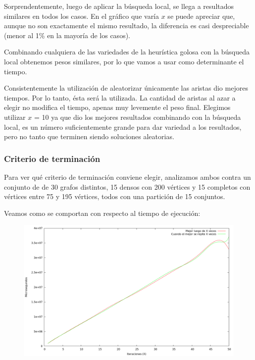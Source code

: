 \vspace*{0.5cm}

Sorprendentemente, luego de aplicar la búsqueda local, se llega a resultados
similares en todos los casos. En el gráfico que varía $x$ se puede apreciar
que, aunque no son exactamente el mismo resultado, la diferencia es casi
despreciable (menor al 1\% en la mayoría de los casos).


Combinando cualquiera de las variedades de la heurística golosa con la
búsqueda local obtenemos pesos similares, por lo que vamos a usar como
determinante el tiempo.

Consistentemente la utilización de aleatorizar únicamente las aristas dio
mejores tiempos. Por lo tanto, ésta será la utilizada. La cantidad de
aristas al azar a elegir no modifica el tiempo, apenas muy levemente el peso
final. Elegimos utilizar $x$ = 10 ya que dio los mejores resultados combinando
con la búsqueda local, es un número suficientemente grande para dar variedad a
los resultados, pero no tanto que terminen siendo soluciones aleatorias.

\subsubsection{Criterio de terminación}

Para ver qué criterio de terminación conviene elegir, analizamos ambos contra
un conjunto de de 30 grafos distintos, 15 densos con 200 vértices y 15 completos
con vértices entre 75 y 195 vértices, todos con una partición de 15 conjuntos.

Veamos como se comportan con respecto al tiempo de ejecución:

\vspace*{0.5cm}

\begin{figure}[H]
  \begin{center}
    \includegraphics[scale=0.35]{imagenes/grasp-criterio-tiempo.png}
  \end{center}
\end{figure}

